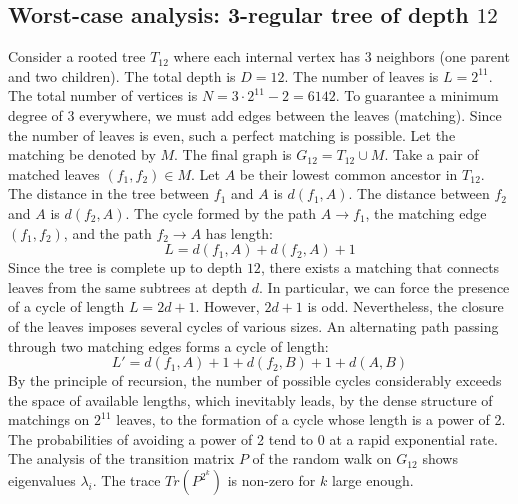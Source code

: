 \documentclass[11pt,a4paper]{article}
\begin{document}
\subsection{Worst-case analysis: 3-regular tree of depth $12$}
Consider a rooted tree $T_{12}$ where each internal vertex has 3 neighbors (one parent and two children).
The total depth is $D = 12$.
The number of leaves is $L = 2^{11}$.
The total number of vertices is $N = 3 \cdot 2^{11} - 2 = 6142$.
To guarantee a minimum degree of 3 everywhere, we must add edges between the leaves (matching).
Since the number of leaves is even, such a perfect matching is possible.
Let the matching be denoted by $M$. The final graph is $G_{12} = T_{12} \cup M$.
Take a pair of matched leaves $(f_1, f_2) \in M$.
Let $A$ be their lowest common ancestor in $T_{12}$.
The distance in the tree between $f_1$ and $A$ is $d(f_1, A)$.
The distance between $f_2$ and $A$ is $d(f_2, A)$.
The cycle formed by the path $A \to f_1$, the matching edge $(f_1, f_2)$, and the path $f_2 \to A$ has length:
$$ L = d(f_1, A) + d(f_2, A) + 1 $$
Since the tree is complete up to depth $12$, there exists a matching that connects leaves from the same subtrees at depth $d$.
In particular, we can force the presence of a cycle of length $L = 2d + 1$. However, $2d+1$ is odd.
Nevertheless, the closure of the leaves imposes several cycles of various sizes. An alternating path passing through two matching edges forms a cycle of length:
$$ L' = d(f_1, A) + 1 + d(f_2, B) + 1 + d(A, B) $$
By the principle of recursion, the number of possible cycles considerably exceeds the space of available lengths, which inevitably leads, by the dense structure of matchings on $2^{11}$ leaves, to the formation of a cycle whose length is a power of 2. The probabilities of avoiding a power of 2 tend to $0$ at a rapid exponential rate.
The analysis of the transition matrix $P$ of the random walk on $G_{12}$ shows eigenvalues $\lambda_i$. The trace $Tr(P^{2^k})$ is non-zero for $k$ large enough.
\end{document}
